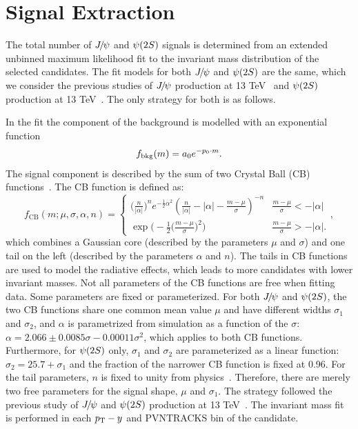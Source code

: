 \section{Signal Extraction}
\label{Signal Extraction}
The total number of ${{J\mskip -3mu/\mskip -2mu\psi}}$ and ${\psi{(2S)}}$ signals is determined from an extended unbinned maximum 
likelihood fit to the invariant mass distribution of the selected candidates. The fit models for both ${{J\mskip -3mu/\mskip -2mu\psi}}$ 
and ${\psi{(2S)}}$ are the same, which we consider the previous studies of ${{J\mskip -3mu/\mskip -2mu\psi}}$ production at 13 TeV~\cite{LHCb-PAPER-2015-037} 
and ${\psi{(2S)}}$ production at 13 TeV~\cite{LHCb:2019eaj}. The only strategy for both is as follows.

In the fit the component of the background is modelled with an exponential function
\begin{equation}
f_{\rm bkg}(m)=a_0e^{-p_0\cdot m}.
\end{equation}
The signal component is described by the sum of two Crystal Ball (CB) functions~\cite{Skwarnicki:1986xj}.
The CB function is defined as:
\begin{equation}
 f_{\mathrm{CB}}(m;\mu,\sigma,\alpha,n) = 
 \begin{cases} 
      \Big(\frac{n}{|\alpha|}\Big)^n e^{-\frac{1}{2}\alpha^2} (\frac{n}{|\alpha|}-|\alpha|-\frac{m-\mu}{\sigma})^{-n} & \frac{m-\mu}{\sigma} < -|\alpha|\\
   \exp\Bigg( -\frac{1}{2}\Big(\frac{m-\mu}{\sigma}\Big)^2\Bigg) & \frac{m-\mu}{\sigma}>-|\alpha|.
\end{cases},
\end{equation}
which combines a Gaussian core (described by the parameters $\mu$ and $\sigma$) and one tail on the left (described by the parameters $\alpha$ and $n$).
The tails in CB functions are used to model the radiative effects, which leads to more candidates with lower invariant masses.
Not all parameters of the CB functions are free when fitting data. 
Some parameters are fixed or parameterized.
For both ${{J\mskip -3mu/\mskip -2mu\psi}}$ and ${\psi{(2S)}}$, the two CB functions share one common mean value $\mu$ and have different widths $\sigma_1$ and $\sigma_2$, and $\alpha$ is parametrized from simulation as a function of the $\sigma$:
$\alpha=2.066\pm0.0085\sigma-0.00011\sigma^2$, which applies to both CB functions. Furthermore, for ${\psi{(2S)}}$ only, $\sigma_1$ and $\sigma_2$ are parameterized as a linear function: $\sigma_2=25.7+\sigma_1$ and the fraction of the narrower CB function is fixed at 0.96. 
For the tail parameters, $n$ is fixed to unity from physics~\cite{LefrancoisTalk}.
Therefore, there are merely two free parameters for the signal shape, $\mu$ and $\sigma_1$. The strategy followed the previous study of ${{J\mskip -3mu/\mskip -2mu\psi}}$ and ${\psi{(2S)}}$ production at 13 TeV~\cite{LHCb-PAPER-2015-037,LHCb:2019eaj}.
The invariant mass fit is performed in each $p_{\mathrm{T}}-y$ and PVNTRACKS bin of the candidate.

